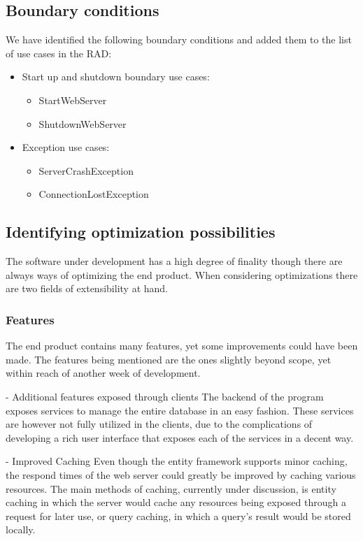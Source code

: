 \subsection{Boundary conditions}

We have identified the following boundary conditions and added them to the list of use cases in the RAD:

\begin{itemize}
	\item Start up and shutdown boundary use cases:
	\begin{itemize}
			\item StartWebServer
			\item ShutdownWebServer
	\end{itemize}
	\item Exception use cases:
	\begin{itemize}
			\item ServerCrashException
			\item ConnectionLostException
	\end{itemize}
\end{itemize}

\subsection{Identifying optimization possibilities}

The software under development has a high degree of finality though there are always ways of optimizing the end product.
When considering optimizations there are two fields of extensibility at hand.

\subsubsection{Features}

The end product contains many features, yet some improvements could have been made.
The features being mentioned are the ones slightly beyond scope, yet within reach of another week of development.

- Additional features exposed through clients
The backend of the program exposes services to manage the entire database in an easy fashion. These services are however not fully utilized in the clients, due to the complications of developing a rich user interface that exposes each of the services in a decent way.

- Improved Caching
Even though the entity framework supports minor caching, the respond times of the web server could greatly be improved by caching various resources.
The main methods of caching, currently under discussion, is entity caching in which the server would cache any resources being exposed through a request for later use, or query caching, in which a query's result would be stored locally.

